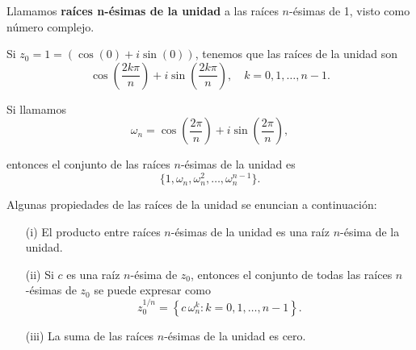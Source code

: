 \begin{defi}
Llamamos \textbf{raíces n-ésimas de la unidad} a las raíces $n$-ésimas de 1, visto como número complejo.
\end{defi}

Si $z_0 = 1 = (\cos(0) + i \sin (0))$, tenemos que las raíces de la unidad son
$$\cos \left( \frac{2k\pi}{n} \right) + i \sin \left( \frac{2k\pi}{n} \right), \quad k = 0,1, \dots, n-1.$$

Si  llamamos \cite{Churchill}
$$\omega_n = \cos \left( \frac{2\pi}{n} \right) + i \sin \left( \frac{2\pi}{n} \right),$$

entonces el conjunto de las raíces $n$-ésimas de la unidad es
$$\{1, \omega_n, \omega_n^2, \dots, \omega_n^{n-1}\}.$$

\begin{propo}
Algunas propiedades de las raíces de la unidad se enuncian a continuación:

\begin{itemize}
\item[(i)] El producto entre raíces $n$-ésimas de la unidad es una raíz $n$-ésima de la unidad.

\item[(ii)] Si $c$ es una raíz $n$-ésima de $z_0$, entonces el conjunto de todas las raíces $n$-ésimas de $z_0$ se puede expresar como 
$$z_0^{1/n} = \left\{ c \, \omega_n^k : k = 0, 1, \dots, n-1 \right\}.$$

\item[(iii)] La suma de las raíces $n$-ésimas de la unidad es cero.
\end{itemize}
\end{propo}

